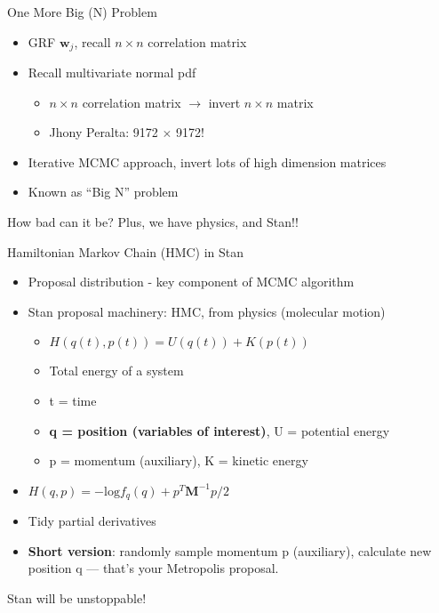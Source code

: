 \documentclass{beamer}
\begin{document}
\begin{frame}{One More Big (N) Problem}

\begin{itemize}
\addtolength{\itemsep}{0.5\baselineskip}
\item GRF $\pmb{w}_{j}$, recall $n \times n$ correlation matrix 
\item Recall multivariate normal pdf
    \begin{itemize}
    \addtolength{\itemsep}{0.5\baselineskip}
    \item $n \times n$ correlation matrix $\rightarrow$ invert $n \times n$ matrix
    \item Jhony Peralta: 9172 $\times$ 9172!
    \end{itemize}
\item Iterative MCMC approach, invert lots of high dimension matrices
\item Known as ``Big N'' problem
\end{itemize}

How bad can it be? Plus, we have physics, and Stan!!
\end{frame}

\begin{frame}{Hamiltonian Markov Chain (HMC) in Stan}
\begin{itemize}
\addtolength{\itemsep}{0.5\baselineskip}
\item Proposal distribution - key component of MCMC algorithm
\item Stan proposal machinery: HMC, from physics (molecular motion)
  \begin{itemize}
  \addtolength{\itemsep}{0.5\baselineskip}
  \item $H(q(t),p(t)) = U(q(t)) + K(p(t))$
  \item Total energy of a system
  \item t = time
  \item {\bf q = position (variables of interest)}, U = potential energy
  \item p = momentum (auxiliary), K = kinetic energy
  \end{itemize}
\item $H(q,p) = -\text{log}f_{q}(q) + p^{T}\pmb{M}^{-1}p/2$
\item Tidy partial derivatives
\item {\bf Short version}: randomly sample momentum p (auxiliary), calculate new position q  --- that's your Metropolis proposal.
\end{itemize}

Stan will be unstoppable!
\end{frame}
\end{document}
